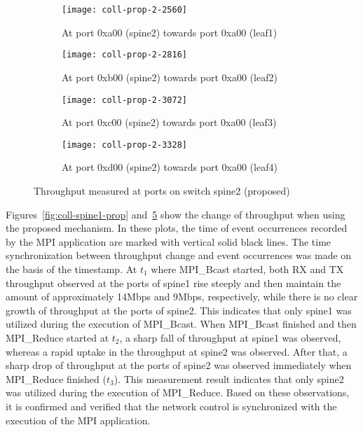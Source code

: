 \begin{figure}
    \begin{subfigure}{.45\linewidth}
        \texttt{[image: coll-prop-2-2560]}
        \caption{At port 0xa00 (spine2) \newline towards port 0xa00 (leaf1)}%
        \label{fig:spine2-leaf1-prop}
    \end{subfigure}
    \begin{subfigure}{.45\linewidth}
        \texttt{[image: coll-prop-2-2816]}
        \caption{At port 0xb00 (spine2) \newline towards port 0xa00 (leaf2)}%
        \label{fig:spine2-leaf2-prop}
    \end{subfigure}
    \begin{subfigure}{.45\linewidth}
        \texttt{[image: coll-prop-2-3072]}
        \caption{At port 0xc00 (spine2) \newline towards port 0xa00 (leaf3)}%
        \label{fig:spine2-leaf3-prop}
    \end{subfigure}
    \begin{subfigure}{.45\linewidth}
        \texttt{[image: coll-prop-2-3328]}
        \caption{At port 0xd00 (spine2) \newline towards port 0xa00 (leaf4)}%
        \label{fig:spine2-leaf4-prop}
    \end{subfigure}
    \caption{Throughput measured at ports on switch spine2 (proposed)}%
    \label{fig:coll-spine2-prop}
\end{figure}


Figures~\ref{fig:coll-spine1-prop} and~\ref{fig:coll-spine2-prop} show
the change of throughput when using the proposed mechanism. In these
plots, the time of event occurrences recorded by the MPI application are
marked with vertical solid black lines. The time synchronization between
throughput change and event occurrences was made on the basis of the
timestamp. At \(t_1\) where MPI\_Bcast started, both RX and TX
throughput observed at the ports of spine1 rise steeply and then
maintain the amount of approximately 14Mbps and 9Mbps, respectively,
while there is no clear growth of throughput at the ports of spine2.
This indicates that only spine1 was utilized during the execution of
MPI\_Bcast. When MPI\_Bcast finished and then MPI\_Reduce started at
\(t_2\), a sharp fall of throughput at spine1 was observed, whereas a
rapid uptake in the throughput at spine2 was observed. After that, a
sharp drop of throughput at the ports of spine2 was observed immediately
when MPI\_Reduce finished (\(t_3\)). This measurement result indicates
that only spine2 was utilized during the execution of MPI\_Reduce. Based
on these observations, it is confirmed and verified that the network
control is synchronized with the execution of the MPI application.

